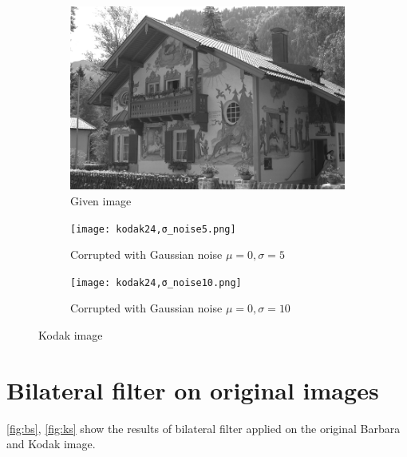 \documentclass[a4paper, landscape]{article}
\begin{document}
\begin{figure}
    \centering
    \begin{subfigure}{0.33\linewidth}
        \centering
        \includegraphics[width=\linewidth]{kodak24.png}
        \caption{Given image}
    \end{subfigure}
    \begin{subfigure}{0.33\linewidth}
        \centering
        \texttt{[image: kodak24,σ\_noise5.png]}
        \caption{Corrupted with Gaussian noise $\mu=0, \sigma=5$}
    \end{subfigure}
    \begin{subfigure}{0.33\linewidth}
        \centering
        \texttt{[image: kodak24,σ\_noise10.png]}
        \caption{Corrupted with Gaussian noise $\mu=0, \sigma=10$}
    \end{subfigure}
    \caption{Kodak image}
    \label{fig:ko}
\end{figure}
\section{Bilateral filter on original images}
\ref{fig:bs}, \ref{fig:ks} show the results of bilateral filter applied on the original Barbara and Kodak image.
\end{document}
